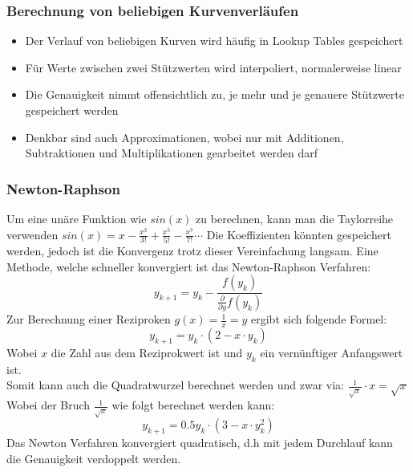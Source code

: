 \subsubsection{Berechnung von beliebigen Kurvenverläufen}
\begin{itemize}
	\item Der Verlauf von beliebigen Kurven wird häufig in Lookup Tables gespeichert
	\item Für Werte zwischen zwei Stützwerten wird interpoliert, normalerweise linear
	\item Die Genauigkeit nimmt offensichtlich zu, je mehr und je genauere Stützwerte gespeichert werden
	\item Denkbar sind auch Approximationen, wobei nur mit Additionen, Subtraktionen und Multiplikationen gearbeitet werden darf
\end{itemize}

\subsubsection{Newton-Raphson}
Um eine unäre Funktion wie $sin(x)$ zu berechnen, kann man die Taylorreihe verwenden $sin(x) = x - \frac{x^3}{3!} + \frac{x^5}{5!} - \frac{x^7}{7!}\cdots$ Die Koeffizienten könnten gespeichert werden, jedoch ist die Konvergenz trotz dieser Vereinfachung langsam.
Eine Methode, welche schneller konvergiert ist das Newton-Raphson Verfahren:
\begin{equation}
y_{k+1} = y_k - \frac{f(y_k)}{\frac{\partial}{\partial y}f(y_k)}
\end{equation}
Zur Berechnung einer Reziproken $g(x)=\frac{1}{x}=y$ ergibt sich folgende Formel:
\begin{equation}
y_{k+1} = y_k\cdot (2-x\cdot y_k)
\end{equation}
Wobei $x$ die Zahl aus dem Reziprokwert ist und $y_k$ ein vernünftiger Anfangswert ist. \\

Somit kann auch die Quadratwurzel berechnet werden und zwar via: $\frac{1}{\sqrt{x}} \cdot x = \sqrt{x}$\\
Wobei der Bruch $\frac{1}{\sqrt{x}}$ wie folgt berechnet werden kann:
\begin{equation}
y_{k+1} = 0.5y_k\cdot (3-x\cdot y_k^2)
\end{equation}
Das Newton Verfahren konvergiert quadratisch, d.h mit jedem Durchlauf kann die Genauigkeit verdoppelt werden.

